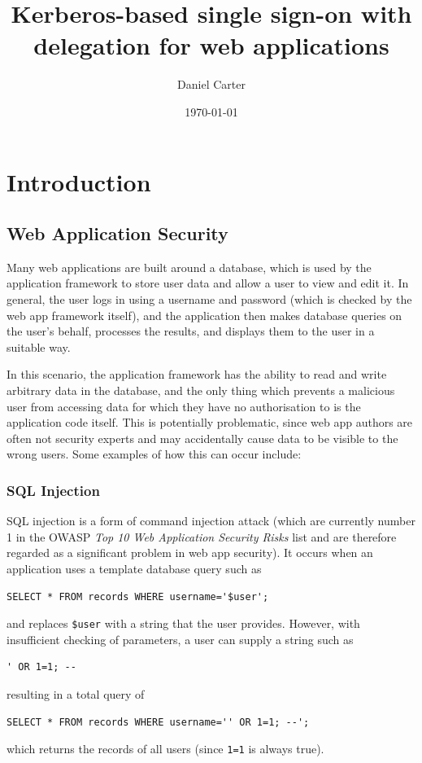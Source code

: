 \documentclass[12pt]{report}
\title{Kerberos-based single sign-on with delegation for web applications}
\author{Daniel Carter}
\date {\today}
\begin{document}
\maketitle

\tableofcontents

\chapter{Introduction}

\section{Web Application Security}
\label{sec:web_application_security}
Many web applications are built around a database, which is used by the application framework to store user data and allow a user to view and edit it. In general, the user logs in using a username and password (which is checked by the web app framework itself), and the application then makes database queries on the user's behalf, processes the results, and displays them to the user in a suitable way.

In this scenario, the application framework has the ability to read and write arbitrary data in the database, and the only thing which prevents a malicious user from accessing data for which they have no authorisation to is the application code itself. This is potentially problematic, since web app authors are often not security experts and may accidentally cause data to be visible to the wrong users. Some examples of how this can occur include:

\subsection{SQL Injection}
\label{sec:sql_injection}
SQL injection is a form of command injection attack (which are currently number 1 in the OWASP \textit{Top 10 Web Application Security Risks} list\cite{OWASP10} and are therefore regarded as a significant problem in web app security). It occurs when an application uses a template database query such as
\begin{verbatim}
SELECT * FROM records WHERE username='$user';
\end{verbatim}
and replaces \verb+$user+ with a string that the user provides. However, with insufficient checking of parameters, a user can supply a string such as
\begin{verbatim}
' OR 1=1; --
\end{verbatim}
resulting in a total query of
\begin{verbatim}
SELECT * FROM records WHERE username='' OR 1=1; --';
\end{verbatim}
which returns the records of all users (since \verb+1=1+ is always true).
\end{document}
